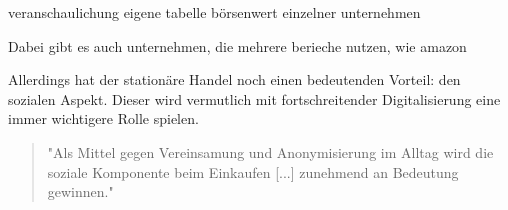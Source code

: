 veranschaulichung eigene tabelle börsenwert einzelner unternehmen

Dabei gibt es auch unternehmen, die mehrere berieche nutzen, wie amazon
\fi


Allerdings hat der stationäre Handel noch einen bedeutenden Vorteil: den sozialen Aspekt. Dieser wird vermutlich mit fortschreitender Digitalisierung eine immer wichtigere Rolle spielen\cite[S. 50]{Ebert}.
\begin{quote}
"Als Mittel gegen Vereinsamung und Anonymisierung im Alltag wird die soziale Komponente beim Einkaufen [...] zunehmend an Bedeutung gewinnen."\cite[S. 43]{Nitt}
\end{quote}
